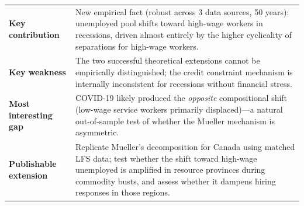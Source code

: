 \vspace{6pt}
\begin{quickref}
\begin{tabularx}{\linewidth}{@{}lX@{}}
\textbf{Key contribution} &
  New empirical fact (robust across 3 data sources, 50 years): unemployed
  pool shifts toward high-wage workers in recessions, driven almost entirely
  by the higher cyclicality of separations for high-wage workers. \\[4pt]
\textbf{Key weakness} &
  The two successful theoretical extensions cannot be empirically
  distinguished; the credit constraint mechanism is internally inconsistent
  for recessions without financial stress. \\[4pt]
\textbf{Most interesting gap} &
  COVID-19 likely produced the \emph{opposite} compositional shift (low-wage
  service workers primarily displaced)---a natural out-of-sample test of
  whether the Mueller mechanism is asymmetric. \\[4pt]
\textbf{Publishable extension} &
  Replicate Mueller's decomposition for Canada using matched LFS data; test
  whether the shift toward high-wage unemployed is amplified in resource
  provinces during commodity busts, and assess whether it dampens hiring
  responses in those regions.
\end{tabularx}
\end{quickref}
